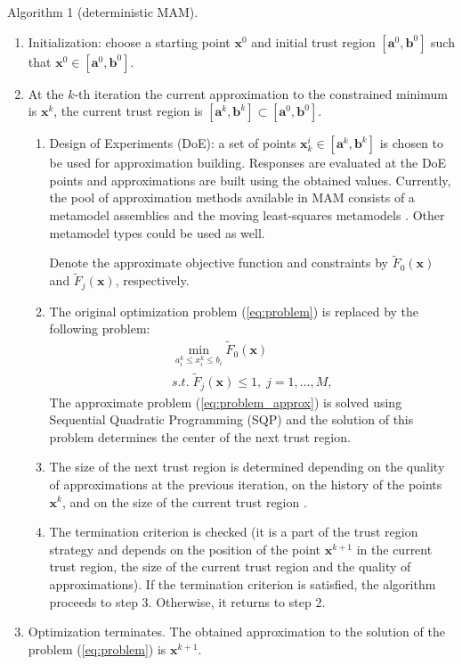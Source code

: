\documentclass{llncs}
\begin{document}
Algorithm 1 (deterministic MAM).
\begin{enumerate}
\item Initialization: choose a starting point $\pmb x^0$ and initial trust region $[\pmb a^0, \pmb b^0]$ such that $\pmb x^0 \in [\pmb a^0, \pmb b^0]$.
\item At the $k$-th iteration the current approximation to the constrained minimum is $\pmb x^k$, the current trust region is $[\pmb a^k, \pmb b^k] \subset [\pmb a^0, \pmb b^0]$.
  \begin{enumerate}[label=(\alph*)]
    \item Design of Experiments (DoE): a set of points $\pmb x_k^i \in [\pmb a^k, \pmb b^k]$ is chosen to be used for approximation building. Responses are evaluated at the DoE points and approximations are built using the obtained values. Currently, the pool of approximation methods available in MAM consists of a metamodel assemblies \cite{PolynkinToropov2012} and the moving least-squares metamodels \cite{LancasterSalkauskas1981,Liszka1984,ChoiYounYang2001,ToropovSchrammSahaiJones2005}. Other metamodel types could be used as well.

    Denote the approximate objective function and constraints by $\widetilde{F}_0(\pmb x)$ and $\widetilde{F}_j(\pmb x)$, respectively.
    \item The original optimization problem (\ref{eq:problem}) is replaced by the following problem:
    \begin{equation}
      \label{eq:problem_approx}
      \begin{array}{c}
      \min\limits_{a_i^k \le x_i ^k\le b_i}\widetilde{F}_0(\pmb x) \\
      s.t.\; \widetilde{F}_j(\pmb x) \le 1,\; j=1,\dots ,M,
      \end{array}
    \end{equation}
    The approximate problem (\ref{eq:problem_approx}) is solved using Sequential Quadratic Programming (SQP) and the solution of this problem determines the center of the next trust region.
    \item The size of the next trust region is determined depending on the quality of approximations at the previous iteration, on the history of the points $\pmb x^k$, and on the size of the current trust region \cite{KeulenToropovMarkine1996}.
    \item The termination criterion is checked (it is a part of the trust region strategy and depends on the position of the point $\pmb x^{k+1}$ in the current trust region, the size of the current trust region and the quality of approximations). If the termination criterion is satisfied, the algorithm proceeds to step 3. Otherwise, it returns to step 2.
  \end{enumerate}
  \item Optimization terminates. The obtained approximation to the solution of the problem (\ref{eq:problem}) is $\pmb x^{k+1}$.
\end{enumerate}
\end{document}
